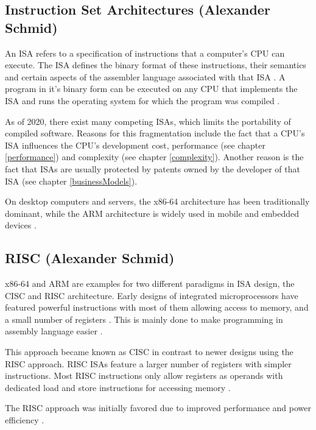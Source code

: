 \documentclass[conference]{IEEEtran}
\begin{document}
	\subsection{Instruction Set Architectures (Alexander Schmid)}
	An \gls{ISA} refers to a specification of instructions that a computer's \gls{CPU} can execute.
	The \gls{ISA} defines the binary format of these instructions, their semantics and certain aspects of the assembler
	language associated with that \gls{ISA} \cite[page 20-23]{Stokes2006}.
	A program in it's binary form can be executed on any \gls{CPU} that implements the \gls{ISA} and runs the operating system
	for which the program was compiled \cite[page 71]{Stokes2006}.

	As of 2020, there exist many competing \glspl{ISA}, which limits the portability of compiled software.
	Reasons for this fragmentation include the fact that a \gls{CPU}'s \gls{ISA} influences the \gls{CPU}'s development cost, performance (see chapter \ref{performance})
	and complexity (see chapter \ref{complexity}). Another reason is the fact that \glspl{ISA} are usually protected by patents owned by the developer of that \gls{ISA} (see chapter \ref{businessModels}).

	On desktop computers and servers, the x86-64 architecture has been traditionally dominant,
	while the ARM architecture is widely used in mobile and embedded devices \cite{Blem2013}.

	\subsection{RISC (Alexander Schmid)}
	x86-64 and ARM are examples for two different paradigms in \gls{ISA} design, the \gls{CISC} and \gls{RISC} architecture.
	Early designs of integrated microprocessors have featured powerful instructions with most of them allowing access to memory,
	and a small number of registers \cite{George1990}. This is mainly done to make programming in assembly language easier \cite[page 73]{Stokes2006}.

	This approach became known as \gls{CISC} in contrast to newer designs using the \gls{RISC} approach.
	\gls{RISC} \glspl{ISA} feature a larger number of registers with simpler instructions.
	Most \gls{RISC} instructions only allow registers as operands with dedicated load and store instructions for accessing memory \cite{George1990}.

	The \gls{RISC} approach was initially favored due to improved performance and power efficiency \cite{George1990}.
	
\end{document}
